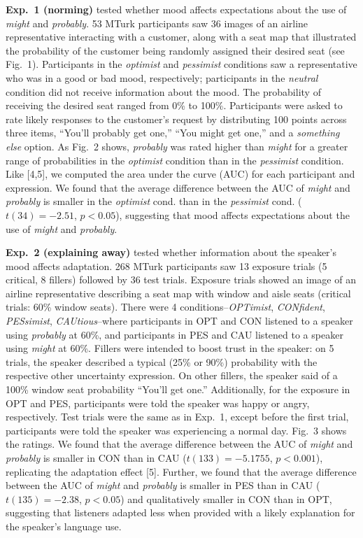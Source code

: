 \documentclass[11pt,a4paper]{article}
\newcommand{\opt}[1]{\textcolor{OptColor}{#1}}
\newcommand{\pes}[1]{\textcolor{PesColor}{#1}}
\newcommand{\cau}[1]{\textcolor{CauColor}{#1}}
\newcommand{\con}[1]{\textcolor{ConColor}{#1}}
\newcommand{\neu}[1]{\textcolor{NeuColor}{#1}}
\begin{document}
\noindent \textbf{Exp.~1 (norming)} tested whether mood affects expectations about the use of \textit{might} and \textit{probably}.  53 MTurk participants saw 36 images of an airline representative interacting with a customer, along with a seat map that illustrated the probability of the customer being randomly assigned their desired seat (see Fig.~1). Participants in the \textit{\opt{optimist}} and \textit{\pes{pessimist}} conditions saw a representative who was in a good or bad mood, respectively; participants in the \textit{\neu{neutral}} condition did not receive information about the mood. The probability of receiving the desired seat ranged from  0\% to 100\%. Participants were asked to rate likely responses to the customer's request by distributing 100 points across three items, ``You'll probably get one,'' ``You might get one,'' and a \textit{something else} option. As Fig.~2 shows, \textit{probably} was rated higher than \textit{might} for a greater range of probabilities in the \textit{\opt{optimist}} condition than in the \textit{\pes{pessimist}} condition. Like [4,5], we computed the area under the curve (AUC) for each participant and expression. We found that the average difference between the AUC of \textit{might} and \textit{probably} is smaller in the \textit{\opt{optimist}} cond. than in the \textit{\pes{pessimist}} cond. ($t(34)=-2.51$, $p < 0.05$), suggesting that mood affects expectations about the use of \textit{might} and \textit{probably}. 

\noindent \textbf{Exp.~2 (explaining away)} tested whether information about the speaker's mood affects adaptation. 268 MTurk participants saw 13 exposure trials (5 critical, 8 fillers) followed by 36 test trials. Exposure trials showed an image of an airline representative describing a seat map with window and aisle seats (critical trials: 60\% window seats). There were 4 conditions--\textit{\opt{OPTimist}}, \textit{\con{CONfident}}, \textit{\pes{PESsimist}}, \textit{\cau{CAUtious}}--where participants in \opt{OPT} and \con{CON} listened to a speaker using \textit{probably} at 60\%, and participants in \pes{PES} and \cau{CAU} listened to a speaker using \textit{might} at 60\%. Fillers were intended to boost trust in the speaker: on 5 trials, the speaker described a typical (25\% or 90\%) probability with the respective other uncertainty expression. On other fillers, the speaker said of a 100\% window seat probability ``You'll get one.'' Additionally, for the exposure in \opt{OPT} and \pes{PES}, participants were told the speaker was happy or angry, respectively. Test trials were the same as in Exp.~1, except before the first trial, participants were told the speaker was experiencing a normal day. Fig.~3 shows the ratings. We found that the average difference between the AUC of \textit{might} and \textit{probably} is smaller in \con{CON} than in \cau{CAU} ($t(133)=-5.1755$, $p < 0.001$), replicating the adaptation effect [5]. Further, we found that the average difference between the AUC of \textit{might} and \textit{probably} is smaller in \pes{PES} than in \cau{CAU} ($t(135)=-2.38$, $p < 0.05$) and qualitatively smaller in \con{CON} than in \opt{OPT}, suggesting that listeners adapted less when provided with a likely explanation for the speaker's language use.
\end{document}
